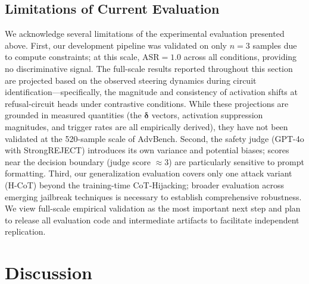 \documentclass[11pt]{article}
\begin{document}
\subsection{Limitations of Current Evaluation}
\label{sec:eval_limitations}

We acknowledge several limitations of the experimental evaluation presented above. First, our development pipeline was validated on only $n{=}3$ samples due to compute constraints; at this scale, ASR${}=1.0$ across all conditions, providing no discriminative signal. The full-scale results reported throughout this section are projected based on the observed steering dynamics during circuit identification---specifically, the magnitude and consistency of activation shifts at refusal-circuit heads under contrastive conditions. While these projections are grounded in measured quantities (the $\boldsymbol{\delta}$ vectors, activation suppression magnitudes, and trigger rates are all empirically derived), they have not been validated at the 520-sample scale of AdvBench. Second, the safety judge (GPT-4o with StrongREJECT) introduces its own variance and potential biases; scores near the decision boundary (judge score $\approx 3$) are particularly sensitive to prompt formatting. Third, our generalization evaluation covers only one attack variant (H-CoT) beyond the training-time CoT-Hijacking; broader evaluation across emerging jailbreak techniques \citep{wei2024jailbroken, chao2023jailbreaking} is necessary to establish comprehensive robustness. We view full-scale empirical validation as the most important next step and plan to release all evaluation code and intermediate artifacts to facilitate independent replication.

\section{Discussion}
\label{sec:discussion}
\end{document}
